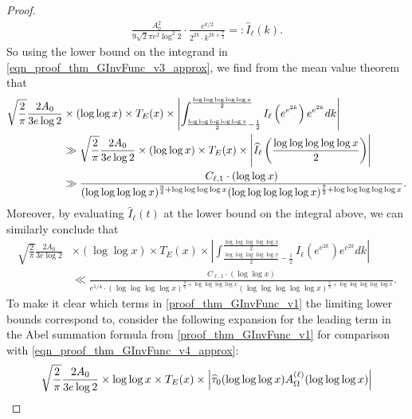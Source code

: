 \documentclass[11pt,reqno,a4letter]{article}
\numberwithin{figure}{section}
\numberwithin{table}{section}
\theoremstyle{plain}
\numberwithin{theorem}{section}
\theoremstyle{definition}
\begin{document}
\begin{proof}
\begin{align}
     \frac{A_0^2}{9 \sqrt{2} \pi e^2 \log^2 2} \cdot \frac{e^{k/2}}{2^{2k} \cdot k^{2k+\frac{7}{2}}} 
     =: \widehat{I}_{\ell}(k). 
\end{align} 
So using the lower bound on the integrand in 
\eqref{eqn_proof_thm_GInvFunc_v3_approx}, 
we find from the mean value theorem that 
\begin{align} 
\notag 
\sqrt{\frac{2}{\pi}} \frac{2 A_0}{3e \log 2} & \times (\log\log x) \times T_E(x) \times 
     \left\lvert 
     \int_{\frac{\log\log\log\log\log x}{2}-\frac{1}{2}}^{\frac{\log\log\log\log\log x}{2}} 
     I_{\ell}\left(e^{e^{2k}}\right) 
     e^{e^{2k}} dk \right\rvert \\ 
\notag 
     & \gg \sqrt{\frac{2}{\pi}} \frac{2 A_0}{3e \log 2} \times (\log\log x) \times T_E(x) \times 
     \Biggl\lvert 
     \widehat{I}_{\ell}\left(\frac{\log\log\log\log\log x}{2}\right)
     \Biggr\rvert \\ 
\label{eqn_proof_thm_GInvFunc_v4_approx} 
     & \gg \frac{C_{\ell,1} \cdot (\log\log x)}{ 
     (\log\log\log\log x)^{\frac{9}{4} + \log\log\log\log x} 
     (\log\log\log\log\log x)^{\frac{7}{2} + \log\log\log\log\log x}}. 
\end{align} 
Moreover, by evaluating $\widehat{I}_{\ell}(t)$ at the lower bound on the integral above, we can 
similarly conclude that 
\begin{align*} 
\sqrt{\frac{2}{\pi}} \frac{2 A_0}{3e \log 2} & \times (\log\log x) \times T_E(x) \times 
     \left\lvert 
     \int_{\frac{\log\log\log\log\log x}{2}-\frac{1}{2}}^{\frac{\log\log\log\log\log x}{2}} 
     I_{\ell}\left(e^{e^{2k}}\right) 
     e^{e^{2k}} dk \right\rvert \\ 
     & \ll 
     \frac{C_{\ell,1} \cdot (\log\log x)}{e^{1/4} \cdot 
     (\log\log\log\log x)^{\frac{9}{4} + \log\log\log\log x} 
     (\log\log\log\log\log x)^{\frac{5}{2} + \log\log\log\log\log x}}. 
\end{align*} 
To make it clear which terms in \eqref{proof_thm_GInvFunc_v1} 
the limiting lower bounds correspond to, consider the following expansion for the leading term in 
the Abel summation formula from \eqref{proof_thm_GInvFunc_v1} for comparison with 
\eqref{eqn_proof_thm_GInvFunc_v4_approx}: 
\begin{align} 
\notag 
\sqrt{\frac{2}{\pi}} \frac{2 A_0}{3e \log 2} & \times \log\log x \times T_E(x) \times 
     \left\lvert \widehat{\tau}_0(\log\log\log x) A_{\Omega}^{(\ell)}(\log\log\log x) \right\rvert \\ 
\label{eqn_proof_thm_GInvFunc_v5_approx} 

\end{align}
\end{proof}
\end{document}

